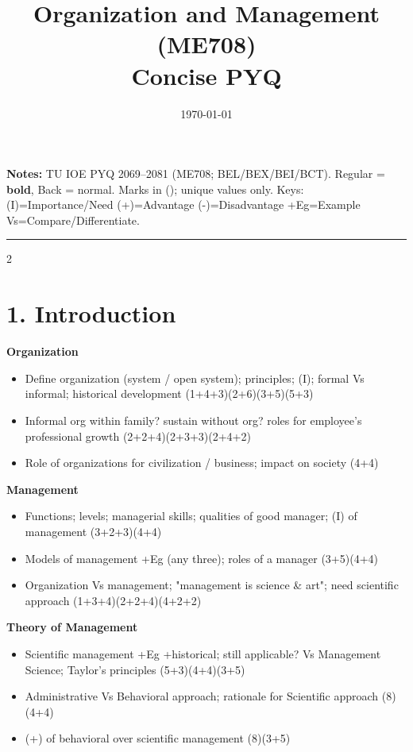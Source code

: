 \documentclass[10pt]{article}
\title{Organization and Management (ME708)\\[0.3em]\large Concise PYQ}
\author{}
\date{\today}
\begin{document}
\maketitle
\vspace{-1em}
\small
\textbf{Notes:} TU IOE PYQ 2069--2081 (ME708; BEL/BEX/BEI/BCT). Regular = \textbf{bold}, Back = normal.
Marks in (); unique values only.
Keys: (I)=Importance/Need \quad (+)=Advantage \quad (-)=Disadvantage \quad +Eg=Example \quad Vs=Compare/Differentiate.
\vspace{2pt}
\hrule
\vspace{4pt}

\begin{multicols}{2}
\footnotesize

\section*{1. Introduction}
\textbf{Organization}
\begin{itemize}
  \item Define organization (system / open system); principles; (I); formal Vs informal; historical development \hfill (1+4+3)(2+6)(3+5)(5+3)
  \item Informal org within family? sustain without org? roles for employee's professional growth \hfill (2+2+4)(2+3+3)(2+4+2)
  \item Role of organizations for civilization / business; impact on society \hfill (4+4)
\end{itemize}
\textbf{Management}
\begin{itemize}
  \item Functions; levels; managerial skills; qualities of good manager; (I) of management \hfill (3+2+3)(4+4)
  \item Models of management +Eg (any three); roles of a manager \hfill (3+5)(4+4)
  \item Organization Vs management; "management is science \& art"; need scientific approach \hfill (1+3+4)(2+2+4)(4+2+2)
\end{itemize}
\textbf{Theory of Management}
\begin{itemize}
  \item Scientific management +Eg +historical; still applicable? Vs Management Science; Taylor's principles \hfill (5+3)(4+4)(3+5)
  \item Administrative Vs Behavioral approach; rationale for Scientific approach \hfill (8)(4+4)
  \item (+) of behavioral over scientific management \hfill (8)(3+5)

\end{itemize}
\end{multicols}
\end{document}
